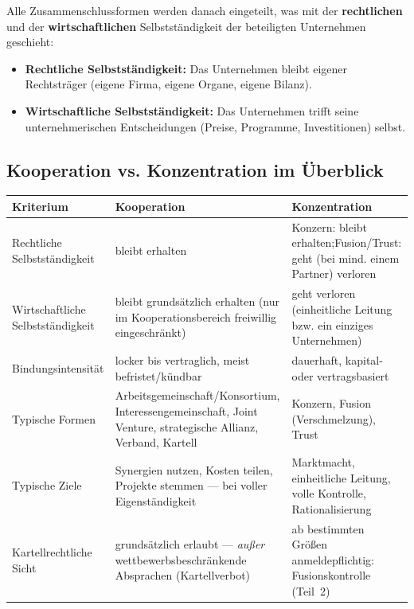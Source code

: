 \documentclass[11pt, a4paper]{article}
\begin{document}
Alle Zusammenschlussformen werden danach eingeteilt, was mit der
\textbf{rechtlichen} und der \textbf{wirtschaftlichen} Selbstständigkeit der beteiligten
Unternehmen geschieht:

\begin{itemize}
  \item \textbf{Rechtliche Selbstständigkeit:} Das Unternehmen bleibt eigener
    Rechtsträger (eigene Firma, eigene Organe, eigene Bilanz).
  \item \textbf{Wirtschaftliche Selbstständigkeit:} Das Unternehmen trifft seine
    unternehmerischen Entscheidungen (Preise, Programme, Investitionen) selbst.
\end{itemize}

\subsection{Kooperation vs. Konzentration im Überblick}

\begin{center}
\begin{tabular}{p{4.2cm} p{4.9cm} p{4.9cm}}
\toprule
\textbf{Kriterium} & \textbf{Kooperation} & \textbf{Konzentration}\\
\midrule
Rechtliche Selbstständigkeit & bleibt erhalten & Konzern: bleibt erhalten;\newline Fusion/Trust: geht (bei mind. einem Partner) verloren\\
\addlinespace[3pt]
Wirtschaftliche Selbstständigkeit & bleibt grundsätzlich erhalten (nur im Kooperationsbereich freiwillig eingeschränkt) & geht verloren (einheitliche Leitung bzw. ein einziges Unternehmen)\\
\addlinespace[3pt]
Bindungsintensität & locker bis vertraglich, meist befristet/kündbar & dauerhaft, kapital- oder vertragsbasiert\\
\addlinespace[3pt]
Typische Formen & Arbeitsgemeinschaft/Konsortium, Interessengemeinschaft, Joint Venture, strategische Allianz, Verband, Kartell & Konzern, Fusion (Verschmelzung), Trust\\
\addlinespace[3pt]
Typische Ziele & Synergien nutzen, Kosten teilen, Projekte stemmen --- bei voller Eigenständigkeit & Marktmacht, einheitliche Leitung, volle Kontrolle, Rationalisierung\\
\addlinespace[3pt]
Kartellrechtliche Sicht & grundsätzlich erlaubt --- \emph{außer} wettbewerbsbeschränkende Absprachen (Kartellverbot) & ab bestimmten Größen anmeldepflichtig: Fusionskontrolle (Teil~2)\\
\bottomrule
\end{tabular}
\end{center}
\end{document}

